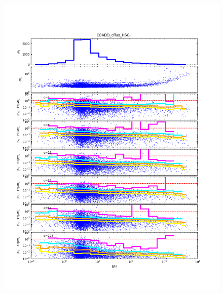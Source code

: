 \begin{figure}[t]
\centering
    \begin{minipage}{.49\textwidth}
        \centering
        \includegraphics[width=1.0\textwidth]{figure/plot_coadd_cflux_HSC-I.png}
    \end{minipage}
    \begin{minipage}{.49\textwidth}
        \centering

\end{minipage}
\end{figure}
